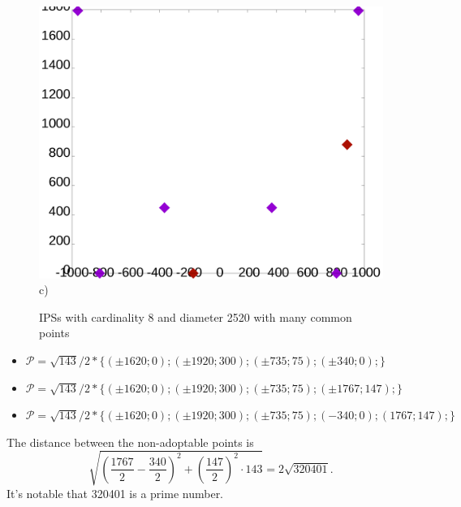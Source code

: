 \documentclass[12pt]{article}
\theoremstyle{theorem}
\theoremstyle{dfn}
\theoremstyle{remark}
\begin{document}
\begin{figure}[h!]
\begin{minipage}[h]{0.32\linewidth}
\begin{center}
		\end{center}
	\end{minipage}
	\begin{minipage}[h]{0.32\linewidth}
		\begin{center}
			\includegraphics[width=1\linewidth]{./img/8_2520_143_4a27_other.png}\\ c)
		\end{center}
	\end{minipage}
	\hfill
	\caption{IPSs with cardinality 8 and diameter 2520 with many common points}
	\label{8_with_many_common}
\end{figure}

\begin{itemize}
\item
$\mathcal{P}=\sqrt{143}/2*\{
( \pm1620 ; 0);
( \pm1920 ; 300);
( \pm735 ; 75);
( \pm340 ; 0);
\}$

\item
$\mathcal{P}=\sqrt{143}/2*\{
( \pm1620 ; 0);
( \pm1920 ; 300);
( \pm735 ; 75);
( \pm1767 ; 147);
\}$

\item
$\mathcal{P}=
\sqrt{143}/2*\{
( \pm1620 ; 0);
( \pm1920 ; 300);
( \pm735 ; 75);
( -340 ; 0);
( 1767 ; 147);
\}$

\end{itemize}

The distance between the non-adoptable points is
\begin{equation}
	\sqrt{\left(\frac{1767}{2} - \frac{340}{2}\right)^2 + \left(\frac{147}{2}\right)^2\cdot143} = 2\sqrt{320401}
	.
\end{equation}
It's notable that 320401 is a prime number.
\end{document}
